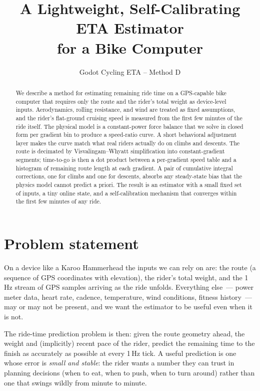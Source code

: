 \documentclass[11pt,a4paper]{article}
\title{A Lightweight, Self-Calibrating ETA Estimator\\
       for a Bike Computer}
\author{Godot Cycling ETA -- Method D}
\date{}
\begin{document}
\maketitle

\begin{abstract}
\noindent
We describe a method for estimating remaining ride time on a GPS-capable
bike computer that requires only the route and the rider's total
weight as device-level inputs. Aerodynamics, rolling resistance, and
wind are treated as fixed assumptions, and the rider's flat-ground
cruising speed is measured from the first few minutes of the ride
itself. The physical model is a constant-power force balance that we
solve in closed form per gradient bin to produce a speed-ratio curve.
A short behavioral adjustment layer makes the curve match what real
riders actually do on climbs and descents. The route is decimated by
Visvalingam--Whyatt simplification into constant-gradient segments;
time-to-go is then a dot product between a per-gradient speed table
and a histogram of remaining route length at each gradient. A pair of
cumulative integral corrections, one for climbs and one for descents,
absorbs any steady-state bias that the physics model cannot predict
a priori. The result is an estimator with a small fixed set of inputs,
a tiny online state, and a self-calibration mechanism that converges
within the first few minutes of any ride.
\end{abstract}

\section{Problem statement}

On a device like a Karoo Hammerhead the inputs we can rely on are:
the route (a sequence of GPS coordinates with elevation), the rider's
total weight, and the 1\,\si{\hertz} stream of GPS samples arriving
as the ride unfolds. Everything else~--- power meter data, heart
rate, cadence, temperature, wind conditions, fitness history~--- may
or may not be present, and we want the estimator to be useful even
when it is not.

The ride-time prediction problem is then: given the route geometry
ahead, the weight and (implicitly) recent pace of the rider, predict
the remaining time to the finish as accurately as possible at every
1\,\si{\hertz} tick. A useful prediction is one whose error is
\emph{small and stable}: the rider wants a number they can trust in
planning decisions (when to eat, when to push, when to turn around)
rather than one that swings wildly from minute to minute.
\end{document}
